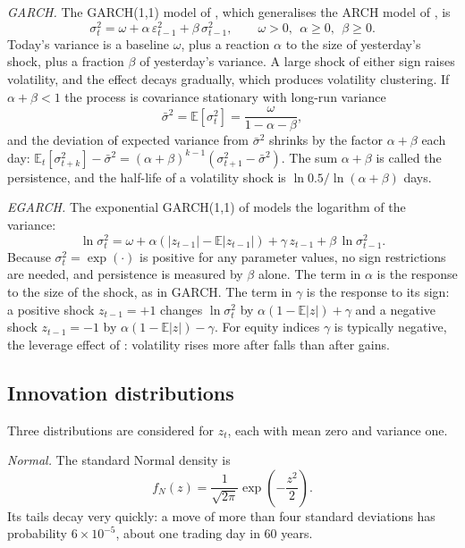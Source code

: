\documentclass[11pt,a4paper]{article}
\newcommand{\E}{\mathbb{E}}
\begin{document}
\emph{GARCH.} The GARCH(1,1) model of \citet{bollerslev1986}, which generalises the ARCH model of \citet{engle1982}, is
\begin{equation}\label{eq:garch}
\sigma_t^2=\omega+\alpha\,\varepsilon_{t-1}^2+\beta\,\sigma_{t-1}^2,\qquad \omega>0,\ \ \alpha\ge 0,\ \ \beta\ge 0 .
\end{equation}
Today's variance is a baseline $\omega$, plus a reaction $\alpha$ to the size of yesterday's shock, plus a fraction $\beta$ of yesterday's variance. A large shock of either sign raises volatility, and the effect decays gradually, which produces volatility clustering. If $\alpha+\beta<1$ the process is covariance stationary with long-run variance
\begin{equation}
\bar\sigma^2=\E[\sigma_t^2]=\frac{\omega}{1-\alpha-\beta},
\end{equation}
and the deviation of expected variance from $\bar\sigma^2$ shrinks by the factor $\alpha+\beta$ each day: $\E_t[\sigma_{t+k}^2]-\bar\sigma^2=(\alpha+\beta)^{k-1}(\sigma_{t+1}^2-\bar\sigma^2)$. The sum $\alpha+\beta$ is called the persistence, and the half-life of a volatility shock is $\ln 0.5/\ln(\alpha+\beta)$ days.

\emph{EGARCH.} The exponential GARCH(1,1) of \citet{nelson1991} models the logarithm of the variance:
\begin{equation}\label{eq:egarch}
\ln\sigma_t^2=\omega+\alpha\left(|z_{t-1}|-\E|z_{t-1}|\right)+\gamma\,z_{t-1}+\beta\,\ln\sigma_{t-1}^2 .
\end{equation}
Because $\sigma_t^2=\exp(\cdot)$ is positive for any parameter values, no sign restrictions are needed, and persistence is measured by $\beta$ alone. The term in $\alpha$ is the response to the size of the shock, as in GARCH. The term in $\gamma$ is the response to its sign: a positive shock $z_{t-1}=+1$ changes $\ln\sigma_t^2$ by $\alpha(1-\E|z|)+\gamma$ and a negative shock $z_{t-1}=-1$ by $\alpha(1-\E|z|)-\gamma$. For equity indices $\gamma$ is typically negative, the leverage effect of \citet{black1976}: volatility rises more after falls than after gains.

\subsection{Innovation distributions}\label{sec:dist}

Three distributions are considered for $z_t$, each with mean zero and variance one.

\emph{Normal.} The standard Normal density is
\begin{equation}
f_N(z)=\frac{1}{\sqrt{2\pi}}\exp\!\left(-\frac{z^{2}}{2}\right).
\end{equation}
Its tails decay very quickly: a move of more than four standard deviations has probability $6\times10^{-5}$, about one trading day in 60 years.
\end{document}
